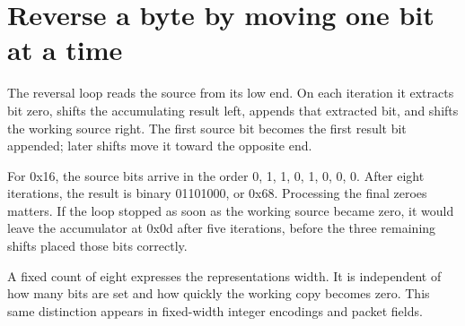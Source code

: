 \section{Reverse a byte by moving one bit at a
  time}\label{003-eight-byte-sprite-p04-reverse-a-byte-by-moving-one-bit-at-a-time}

The reversal loop reads the source from its low end. On each iteration
it extracts bit zero, shifts the accumulating result left, appends that
extracted bit, and shifts the working source right. The first source bit
becomes the first result bit appended; later shifts move it toward the
opposite end.

For 0x16, the source bits arrive in the order 0, 1, 1, 0, 1, 0, 0, 0.
After eight iterations, the result is binary 01101000, or 0x68.
Processing the final zeroes matters. If the loop stopped as soon as the
working source became zero, it would leave the accumulator at 0x0d after
five iterations, before the three remaining shifts placed those bits
correctly.

A fixed count of eight expresses the representation\textquotesingle s
width. It is independent of how many bits are set and how quickly the
working copy becomes zero. This same distinction appears in fixed-width
integer encodings and packet fields.

